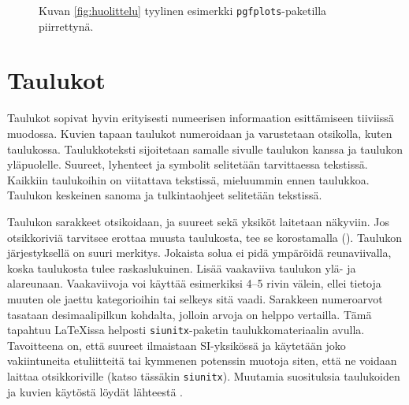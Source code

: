 \begin{figure}
\centering
%
\caption{Kuvan \ref{fig:huolittelu} tyylinen esimerkki \texttt{pgfplots}-paketilla piirrettynä.}
\label{fig:pgf-esimerkki}
\end{figure}

\section{Taulukot}

Taulukot sopivat hyvin erityisesti numeerisen informaation esittämiseen tiiviissä muodossa. Kuvien tapaan taulukot numeroidaan ja varustetaan otsikolla, kuten taulukossa. Taulukkoteksti sijoitetaan samalle sivulle taulukon kanssa ja taulukon yläpuolelle. Suureet, lyhenteet ja symbolit selitetään tarvittaessa tekstissä. Kaikkiin taulukoihin on viitattava tekstissä, mieluummin ennen taulukkoa. Taulukon keskeinen sanoma ja tulkintaohjeet selitetään tekstissä.

Taulukon sarakkeet otsikoidaan, ja suureet sekä yksiköt laitetaan näkyviin. Jos otsikkoriviä tarvitsee erottaa muusta taulukosta, tee se korostamalla (). Taulukon järjestyksellä on suuri merkitys. Jokaista solua ei pidä ympäröidä reunaviivalla, koska taulukosta tulee raskaslukuinen. Lisää vaakaviiva taulukon ylä- ja alareunaan. Vaakaviivoja voi käyttää esimerkiksi 4--5 rivin välein, ellei tietoja muuten ole jaettu kategorioihin tai selkeys sitä vaadi. Sarakkeen numeroarvot tasataan desimaalipilkun kohdalta, jolloin arvoja on helppo vertailla. Tämä tapahtuu \LaTeX{}issa helposti \texttt{siunitx}-paketin \parencite{siunitx} taulukkomateriaalin avulla. Tavoitteena on, että suureet ilmaistaan SI-yksikössä ja käytetään joko vakiintuneita etuliitteitä tai kymmenen potenssin muotoja siten, että ne voidaan laittaa otsikkoriville (katso tässäkin \texttt{siunitx}). Muutamia suosituksia taulukoiden ja kuvien käytöstä löydät lähteestä \parencite{pubadvice2009}.

